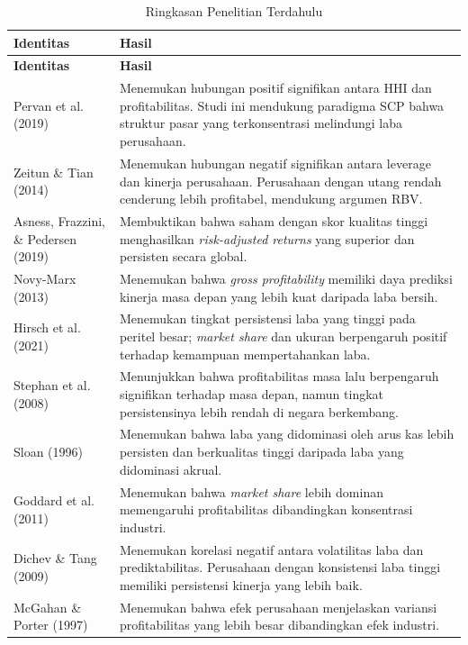 \documentclass[12pt,a4paper]{report}
\begin{document}
\begin{longtable}{>{\raggedright\arraybackslash}p{} >{\raggedright\arraybackslash}p{}}
\caption{Ringkasan Penelitian Terdahulu}\\
\toprule
\textbf{Identitas} & \textbf{Hasil} \\
\midrule
\endfirsthead
\toprule
\textbf{Identitas} & \textbf{Hasil} \\
\midrule
\endhead
Pervan et al. (2019) & Menemukan hubungan positif signifikan antara HHI dan profitabilitas. Studi ini mendukung paradigma SCP bahwa struktur pasar yang terkonsentrasi melindungi laba perusahaan. \\
Zeitun \& Tian (2014) & Menemukan hubungan negatif signifikan antara leverage dan kinerja perusahaan. Perusahaan dengan utang rendah cenderung lebih profitabel, mendukung argumen RBV. \\
Asness, Frazzini, \& Pedersen (2019) & Membuktikan bahwa saham dengan skor kualitas tinggi menghasilkan \textit{risk-adjusted returns} yang superior dan persisten secara global. \\
Novy-Marx (2013) & Menemukan bahwa \textit{gross profitability} memiliki daya prediksi kinerja masa depan yang lebih kuat daripada laba bersih. \\
Hirsch et al. (2021) & Menemukan tingkat persistensi laba yang tinggi pada peritel besar; \textit{market share} dan ukuran berpengaruh positif terhadap kemampuan mempertahankan laba. \\
Stephan et al. (2008) & Menunjukkan bahwa profitabilitas masa lalu berpengaruh signifikan terhadap masa depan, namun tingkat persistensinya lebih rendah di negara berkembang. \\
Sloan (1996) & Menemukan bahwa laba yang didominasi oleh arus kas lebih persisten dan berkualitas tinggi daripada laba yang didominasi akrual. \\
Goddard et al. (2011) & Menemukan bahwa \textit{market share} lebih dominan memengaruhi profitabilitas dibandingkan konsentrasi industri. \\
Dichev \& Tang (2009) & Menemukan korelasi negatif antara volatilitas laba dan prediktabilitas. Perusahaan dengan konsistensi laba tinggi memiliki persistensi kinerja yang lebih baik. \\
McGahan \& Porter (1997) & Menemukan bahwa efek perusahaan menjelaskan variansi profitabilitas yang lebih besar dibandingkan efek industri. \\
\bottomrule
\end{longtable}
\end{document}

